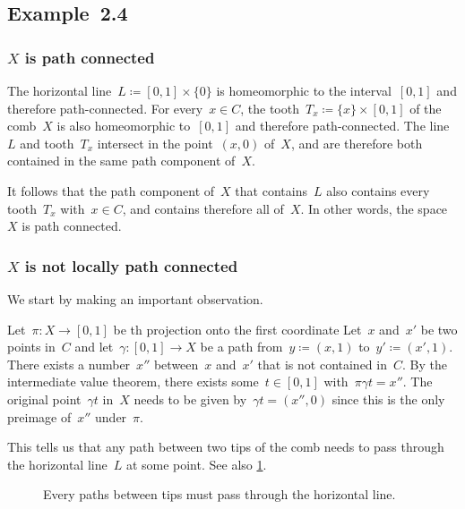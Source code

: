 \subsection{Example~2.4}



\subsubsection{$X$ is path connected}

The horizontal line~$L ≔ [0, 1] × \{ 0 \}$ is homeomorphic to the interval~$[0, 1]$ and therefore path-connected.
For every~$x ∈ C$, the tooth~$T_x ≔ \{ x \} × [0, 1]$ of the comb~$X$ is also homeomorphic to~$[0, 1]$ and therefore path-connected.
The line~$L$ and tooth~$T_x$ intersect in the point~$(x, 0)$ of~$X$, and are therefore both contained in the same path component of~$X$.

It follows that the path component of~$X$ that contains~$L$ also contains every tooth~$T_x$ with~$x ∈ C$, and contains therefore all of~$X$.
In other words, the space~$X$ is path connected.



\subsubsection{$X$ is not locally path connected}

We start by making an important observation.

Let~$π \colon X \to [0, 1]$ be th projection onto the first coordinate
Let~$x$ and~$x'$ be two points in~$C$ and let~$γ \colon [0, 1] \to X$ be a path from~$y ≔ (x, 1)$ to~$y' ≔ (x', 1)$.
There exists a number~$x''$ between~$x$ and~$x'$ that is not contained in~$C$.
By the intermediate value theorem, there exists some~$t ∈ [0, 1]$ with~$π γ t = x''$.
The original point~$γ t$ in~$X$ needs to be given by~$γ t = (x'', 0)$ since this is the only preimage of~$x''$ under~$π$.

This tells us that any path between two tips of the comb needs to pass through the horizontal line~$L$ at some point.
See also \cref{path must pass through the horizontal line}.
\begin{figure}
	\centering
	\caption{Every paths between tips must pass through the horizontal line.}
	\label{path must pass through the horizontal line}
\end{figure}

